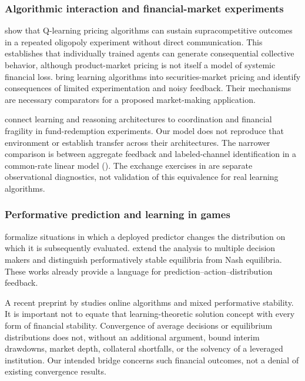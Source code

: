 \documentclass[10pt,twocolumn,letterpaper]{article}
\theoremstyle{definition}
\theoremstyle{remark}
\begin{document}
\subsubsection{Algorithmic interaction and financial-market experiments}
\citet{calvano2020} show that Q-learning pricing algorithms can sustain supracompetitive outcomes in a repeated oligopoly experiment without direct communication. This establishes that individually trained agents can generate consequential collective behavior, although product-market pricing is not itself a model of systemic financial loss. \citet{colliard2026} bring learning algorithms into securities-market pricing and identify consequences of limited experimentation and noisy feedback. Their mechanisms are necessary comparators for a proposed market-making application.

\citet{anand2026} connect learning and reasoning architectures to coordination and financial fragility in fund-redemption experiments. Our model does not reproduce that environment or establish transfer across their architectures. The narrower comparison is between aggregate feedback and labeled-channel identification in a common-rate linear model (). The exchange exercises in  are separate observational diagnostics, not validation of this equivalence for real learning algorithms.

\subsubsection{Performative prediction and learning in games}
\citet{perdomo2020} formalize situations in which a deployed predictor changes the distribution on which it is subsequently evaluated. \citet{narang2023} extend the analysis to multiple decision makers and distinguish performatively stable equilibria from Nash equilibria. These works already provide a language for prediction--action--distribution feedback.

A recent preprint by \citet{farina2026} studies online algorithms and mixed performative stability. It is important not to equate that learning-theoretic solution concept with every form of financial stability. Convergence of average decisions or equilibrium distributions does not, without an additional argument, bound interim drawdowns, market depth, collateral shortfalls, or the solvency of a leveraged institution. Our intended bridge concerns such financial outcomes, not a denial of existing convergence results.
\end{document}
